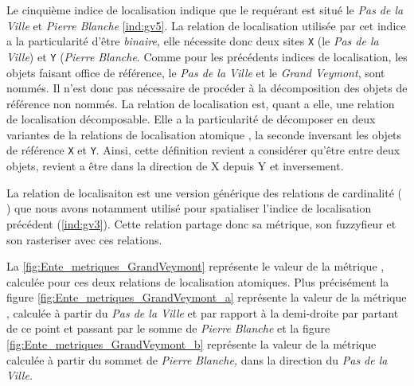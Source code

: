 





Le cinquième indice de localisation indique que le requérant est situé
 le \emph{Pas de la Ville} et \emph{Pierre
  Blanche} \ref{ind:gv5}. La relation de localisation utilisée par cet
indice a la particularité d'être \emph{binaire,} elle nécessite donc
deux sites \texttt{X} (le \emph{Pas de la Ville}) et \texttt{Y}
(\emph{Pierre Blanche}. Comme pour les précédents indices de
localisation, les objets faisant office de référence, le \emph{Pas de
  la Ville} et le \emph{Grand Veymont}, sont nommés. Il n'est donc pas
nécessaire de procéder à la décomposition des objets de référence non
nommés. La relation de localisation  est,
quant a elle, une relation de localisation décomposable. Elle a la
particularité de décomposer en deux variantes de la relations de
localisation atomique , la
seconde inversant les objets de référence \texttt{X} et
\texttt{Y}. Ainsi, cette définition revient a considérer qu'être entre
deux objets, revient a être dans la direction de X depuis Y et
inversement.

La relation de localisaiton  est
une version générique des relations de cardinalité (\eg
{}) que nous avons notamment utilisé pour
spatialiser l'indice de localisation précédent (\ref{ind:gv3}).
%
Cette relation partage donc sa métrique, son fuzzyfieur et son
rasteriser avec ces relations.

La \autoref{fig:Ente_metriques_GrandVeymont} représente le valeur de
la métrique , calculée pour ces deux
relations de localisation atomiques. Plus précisément la figure
\ref{fig:Ente_metriques_GrandVeymont_a} représente la valeur de la
métrique , calculée à partir du \emph{Pas
  de la Ville} et par rapport à la demi-droite par partant de ce point
et passant par le somme de \emph{Pierre Blanche} et la figure
\ref{fig:Ente_metriques_GrandVeymont_b} représente la valeur de la
métrique  calculée à partir du sommet de
\emph{Pierre Blanche,} dans la direction du \emph{Pas de la Ville.}

